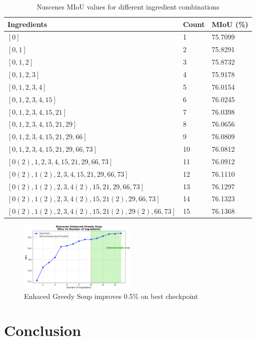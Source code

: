 \documentclass[10pt,twocolumn,letterpaper]{article}
\begin{document}
\begin{table}[htbp]
\centering
\small

\begin{tabular}{|l|l|l|}
\hline
\textbf{Ingredients} & \textbf{Count} & \textbf{MIoU (\%)} \\
\hline
$[0]$ & 1 & 75.7099\\
$[0,1]$ & 2 & 75.8291\\
$[0,1,2]$ & 3 & 75.8732 \\
$[0,1,2,3]$ & 4 & 75.9178 \\
$[0,1,2,3,4]$ & 5 & 76.0154 \\
$[0,1,2,3,4,15]$ & 6 & 76.0245 \\
$[0,1,2,3,4,15,21]$ & 7 & 76.0398 \\
$[0,1,2,3,4,15,21,29]$ & 8 & 76.0656 \\
$[0,1,2,3,4,15,21,29,66]$ & 9 & 76.0809 \\
$[0,1,2,3,4,15,21,29,66,73]$ & 10 & 76.0812 \\
$[0(2),1,2,3,4,15,21,29,66,73]$ & 11 & 76.0912 \\
$[0(2),1(2),2,3,4,15,21,29,66,73]$ & 12 & 76.1110 \\
$[0(2),1(2),2,3,4(2),15,21,29,66,73]$ & 13 & 76.1297 \\
$[0(2),1(2),2,3,4(2),15,21(2),29,66,73]$ & 14 & 76.1323 \\
$[0(2),1(2),2,3,4(2),15,21(2),29(2),66,73]$ & 15 & 76.1368 \\
\hline
\end{tabular}
\caption{Nuscenes MIoU values for different ingredient combinations}
\end{table}


\begin{figure}[h]
    \centering
    \includegraphics[width=0.5\textwidth]{photos/nuscenes.png}
    \caption{Enhaced Greedy Soup improves 0.5\% on best checkpoint }
    \label{fig:photo_example}
\end{figure}


\section{Conclusion}
\end{document}
